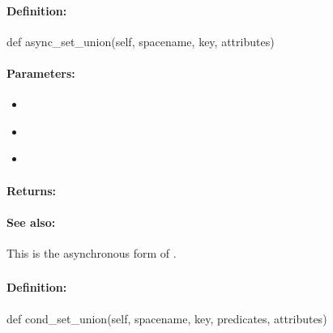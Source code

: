 \paragraph{Definition:}
\begin{pythoncode}
def async_set_union(self, spacename, key, attributes)
\end{pythoncode}

\paragraph{Parameters:}
\begin{itemize}[noitemsep]
\item {}\\

\item {}\\

\item {}\\

\end{itemize}

\paragraph{Returns:}


\paragraph{See also:}  This is the asynchronous form of .

\pagebreak
\subsubsection{}
\label{api:python:cond_set_union}


\paragraph{Definition:}
\begin{pythoncode}
def cond_set_union(self, spacename, key, predicates, attributes)
\end{pythoncode}

